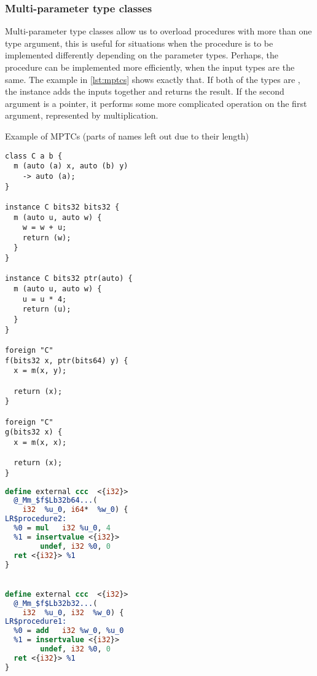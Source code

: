 \subsubsection{Multi-parameter type classes}

Multi-parameter type classes allow us to overload procedures with more than one type argument, this is useful for situations when the procedure is to be implemented differently depending on the parameter types. Perhaps, the procedure can be implemented more efficiently, when the input types are the same. The example in \cref{lst:mptcs} shows exactly that. If both of the types are , the instance adds the inputs together and returns the result. If the second argument is a pointer, it performs some more complicated operation on the first argument, represented by multiplication.
\begin{listing}
    \small
    \caption{Example of MPTCs (parts of names left out due to their length)}
    \label{lst:mptcs}
    \begin{center}
    \begin{minipage}{0.5\linewidth}
    \begin{lstlisting}
class C a b {
  m (auto (a) x, auto (b) y)
    -> auto (a);
}

instance C bits32 bits32 {
  m (auto u, auto w) {
    w = w + u;
    return (w);
  }
}

instance C bits32 ptr(auto) {
  m (auto u, auto w) {
    u = u * 4;
    return (u);
  }
}

foreign "C"
f(bits32 x, ptr(bits64) y) {
  x = m(x, y);

  return (x);
}

foreign "C"
g(bits32 x) {
  x = m(x, x);

  return (x);
}
    \end{lstlisting}
    \end{minipage}%
    \begin{minipage}{0.5\linewidth}
    \begin{lstlisting}[language=LLVM]
define external ccc  <{i32}>
  @_Mm_$f$Lb32b64...(
    i32  %u_0, i64*  %w_0) {
LR$procedure2:
  %0 = mul   i32 %u_0, 4
  %1 = insertvalue <{i32}>
        undef, i32 %0, 0
  ret <{i32}> %1
}


define external ccc  <{i32}>
  @_Mm_$f$Lb32b32...(
    i32  %u_0, i32  %w_0) {
LR$procedure1:
  %0 = add   i32 %w_0, %u_0
  %1 = insertvalue <{i32}>
        undef, i32 %0, 0
  ret <{i32}> %1
}



\end{lstlisting}
\end{minipage}
\end{center}
\end{listing}
